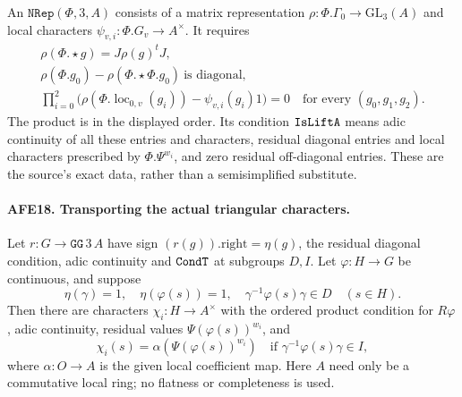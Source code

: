 \documentclass[11pt,a4paper]{article}
\numberwithin{equation}{section}
\theoremstyle{remark}\newtheorem{remark}[theorem]{Remark}
\begin{document}
An \(\texttt{NRep}(\Phi,3,A)\) consists of a matrix
representation \(\rho:\Phi.\Gamma_0\to\mathrm{GL}_3(A)\)
and local characters \(\psi_{v,i}:\Phi.G_v\to A^\times\).
It requires
\[
 \begin{gathered}
 \rho(\Phi.\star g)=J\rho(g)^tJ,\\
 \rho(\Phi.g_0)-\rho(\Phi.\star\Phi.g_0)
                         \ \text{is diagonal},\\
 \prod_{i=0}^{2}
   \bigl(\rho(\Phi.\operatorname{loc}_{0,v}(g_i))
                         -\psi_{v,i}(g_i)1\bigr)=0
                       \quad\text{for every }(g_0,g_1,g_2).
 \end{gathered}                                         \tag{AFE.27}
\]
The product is in the displayed order.
Its condition \(\texttt{Is\allowbreak Lift\allowbreak A}\) means adic continuity
of all these entries and characters, residual diagonal
entries and local characters prescribed by
\(\Phi.\Psi^{w_i}\), and zero residual off-diagonal
entries.  These are the source's exact data, rather
than a semisimplified substitute.

\paragraph{AFE18. Transporting the actual triangular characters.}
\label{claim:AFE18}
Let \(r:G\to\texttt{GG}\,3\,A\) have sign
\((r(g)).\mathrm{right}=\eta(g)\), the residual
diagonal condition, adic continuity and
\(\texttt{Cond\allowbreak T}\) at subgroups \(D,I\).
Let \(\varphi:H\to G\) be continuous, and suppose
\[
 \eta(\gamma)=1,\quad \eta(\varphi(s))=1,\quad
                         \gamma^{-1}\varphi(s)\gamma\in D
                           \quad(s\in H).
 \]
Then there are characters \(\chi_i:H\to A^\times\)
with the ordered product condition for \(R\varphi\),
adic continuity, residual values
\(\Psi(\varphi(s))^{w_i}\), and
\[
 \chi_i(s)=\alpha(\Psi(\varphi(s))^{w_i})
 \quad\text{if }\gamma^{-1}\varphi(s)\gamma\in I,
                                                        \tag{AFE.28}
\]
where \(\alpha:O\to A\) is the given local coefficient map.
Here \(A\) need only be a commutative local ring;
no flatness or completeness is used.
\end{document}
